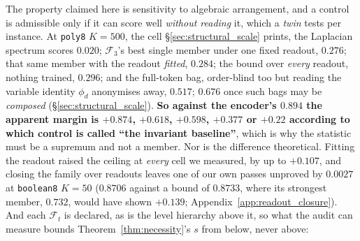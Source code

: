 \noindent The property claimed here is sensitivity to algebraic arrangement, and a control is admissible only if it can score well \emph{without reading} it, which a \emph{twin} tests per instance. At \texttt{poly8} $K{=}500$, the cell \S\ref{sec:structural_scale} prints, the Laplacian spectrum scores $0.020$; $\mathcal{F}_3$'s best single member under one fixed readout, $0.276$; that same member with the readout \emph{fitted}, $0.284$; the bound over \emph{every} readout, nothing trained, $0.296$; and the full-token bag, order-blind too but reading the variable identity $\phi_d$ anonymises away, $0.517$; $0.676$ once such bags may be \emph{composed} (\S\ref{sec:structural_scale}). \textbf{So against the encoder's $0.894$ the apparent margin is $+0.874$, $+0.618$, $+0.598$, $+0.377$ or $+0.22$ according to which control is called ``the invariant baseline''}, which is why the statistic must be a supremum and not a member. Nor is the difference theoretical. Fitting the readout raised the ceiling at \emph{every} cell we measured, by up to $+0.107$, and closing the family over readouts leaves one of our own passes unproved by $0.0027$ at \texttt{boolean8} $K{=}50$ ($0.8706$ against a bound of $0.8733$, where its strongest member, $0.732$, would have shown $+0.139$; Appendix~\ref{app:readout_closure}). And each $\mathcal{F}_t$ is declared, as is the level hierarchy above it, so what the audit can measure bounds Theorem~\ref{thm:necessity}'s $s$ from below, never above:
